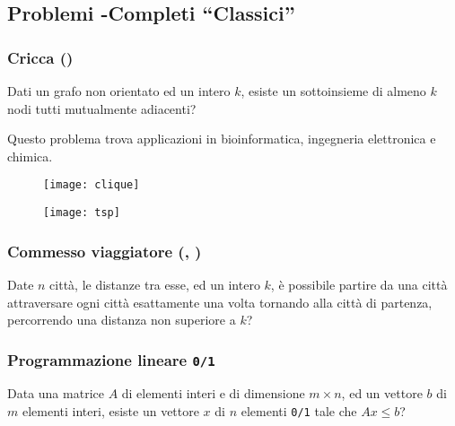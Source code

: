 \subsection{Problemi {\NP}-Completi \enquote{Classici}}

\begin{minipage}[c]{.7\textwidth}
\subsubsection*{Cricca (\cliqueProblem)}

Dati un grafo non orientato ed un intero \(k\), esiste un sottoinsieme di almeno \(k\) nodi tutti mutualmente adiacenti?

Questo problema trova applicazioni in bioinformatica, ingegneria elettronica e chimica.
\end{minipage}%
\begin{minipage}[c]{.3\textwidth}
\begin{figure}[H]\centering
    \texttt{[image: clique]}
\end{figure}
\end{minipage}

\begin{minipage}[c]{.3\textwidth}
\begin{figure}[H]\centering
    \texttt{[image: tsp]}
\end{figure}
\end{minipage}%
\begin{minipage}[c]{.7\textwidth}
\subsubsection*{Commesso viaggiatore (, {\tsp})}

Date \(n\) città, le distanze tra esse, ed un intero \(k\), è possibile partire da una città attraversare ogni città esattamente una volta tornando alla città di partenza, percorrendo una distanza non superiore a \(k\)?
\end{minipage}

\subsubsection*{Programmazione lineare \texttt{0/1}}

Data una matrice \(A\) di elementi interi e di dimensione \(m \times n\), ed un vettore \(b\) di \(m\) elementi interi, esiste un vettore \(x\) di \(n\) elementi \texttt{0/1} tale che \(Ax \leqslant b\)?

